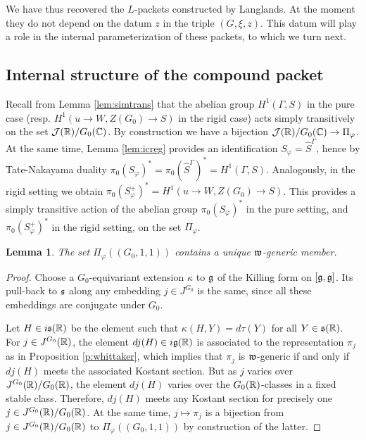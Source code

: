 \documentclass{article}
\newtheorem{lem}[thm]{Lemma}
\theoremstyle{definition}
\numberwithin{equation}{section}
\renewcommand{\-}{\hyp{}}
\begin{document}
We have thus recovered the $L$\-packets constructed by Langlands. At the moment they do not depend on the datum $z$ in the triple $(G,\xi,z)$. This datum will play a role in the internal parameterization of these packets, to which we turn next.

\subsection{Internal structure of the compound packet} \label{sub:intstr}


Recall from Lemma \ref{lem:simtrans} that the abelian group $H^1(\Gamma,S)$ in the pure case (resp. $H^1(u \to W,Z(G_0) \to S)$ in the rigid case) acts simply transitively on the set $\mathcal{J}(\mathbb{R})/G_0(\mathbb{C})$. By construction we have a bijection $\mathcal{J}(\mathbb{R})/G_0(\mathbb{C}) \to \Pi_\varphi$. At the same time, Lemma \ref{lem:icreg} provides an identification $S_\varphi = \hat S^\Gamma$, hence by Tate-Nakayama duality $\pi_0(S_\varphi)^*=\pi_0(\hat S^\Gamma)^*=H^1(\Gamma,S)$. Analogously, in the rigid setting we obtain $\pi_0(S_\varphi^+)^*=H^1(u \to W,Z(G_0) \to S)$. This provides a simply transitive action of the abelian group $\pi_0(S_\varphi)^*$ in the pure setting, and $\pi_0(S_\varphi^+)^*$ in the rigid setting, on the set $\Pi_\varphi$.

\begin{lem} \label{lem:uniqgen}
The set $\Pi_\varphi((G_0,1,1))$ contains a unique $\mathfrak{w}$-generic member.
\end{lem}
\begin{proof}
Choose a $G_0$-equivariant extension $\kappa$ to $\mathfrak{g}$ of the Killing form on $[\mathfrak{g},\mathfrak{g}]$. Its pull-back to $\mathfrak{s}$ along any embedding $j \in J^{G_0}$ is the same, since all these embeddings are conjugate under $G_0$.

Let $H \in i\mathfrak{s}(\mathbb{R})$ be the element such that $\kappa(H,Y)=d\tau(Y)$ for all $Y \in \mathfrak{s}(\mathbb{R})$. For $j \in J^{G_0}(\mathbb{R})$, the element $dj(H) \in i\mathfrak{g}(\mathbb{R})$ is associated to the representation $\pi_j$ as in Proposition \ref{p:whittaker}, which implies that $\pi_j$ is $\mathfrak{w}$-generic if and only if $dj(H)$ meets the associated Kostant section. But as $j$ varies over $J^{G_0}(\mathbb{R})/G_0(\mathbb{R})$, the element $dj(H)$ varies over the $G_0(\mathbb{R})$-classes in a fixed stable class. Therefore, $dj(H)$ meets any Kostant section for precisely one $j \in J^{G_0}(\mathbb{R})/G_0(\mathbb{R})$. At the same time, $j \mapsto \pi_j$ is a bijection from $j \in J^{G_0}(\mathbb{R})/G_0(\mathbb{R})$ to $\Pi_\varphi((G_0,1,1))$ by construction of the latter.
\end{proof}
\end{document}

